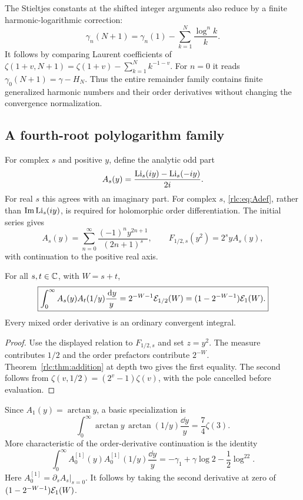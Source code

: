 The Stieltjes constants at the shifted integer arguments also reduce
by a finite harmonic-logarithmic correction:
\begin{equation}\label{rlc:eq:stieltjesshift}
 \gamma_n(N+1)=\gamma_n(1)
           -\sum_{k=1}^N\frac{\log^n k}{k}.
\end{equation}
It follows by comparing Laurent coefficients of
$\zeta(1+v,N+1)=\zeta(1+v)-\sum_{k=1}^N k^{-1-v}$.
For $n=0$ it reads $\gamma_0(N+1)=\gamma-H_N$.
Thus the entire remainder family contains finite generalized harmonic
numbers and their order derivatives without changing the convergence
normalization.

\subsection{A fourth-root polylogarithm family}
For complex $s$ and positive $y$, define the analytic odd part
\begin{equation}\label{rlc:eq:Adef}
 A_s(y)=\frac{\operatorname{Li}_s(iy)-\operatorname{Li}_s(-iy)}{2i}.
\end{equation}
For real $s$ this agrees with an imaginary part. For complex $s$,
\eqref{rlc:eq:Adef}, rather than $\operatorname{Im}\operatorname{Li}_s(iy)$, is required for
holomorphic order differentiation.
The initial series gives
\[
 A_s(y)=\sum_{n=0}^\infty\frac{(-1)^ny^{2n+1}}{(2n+1)^s},\qquad
 F_{1/2,s}(y^2)=2^s y A_s(y),
\]
with continuation to the positive real axis.

\begin{corollary}
\label{rlc:cor:gaussian}
For all $s,t\in\mathbb C$, with $W=s+t$,
\begin{equation}\label{rlc:eq:gaussian}
 \boxed{\displaystyle
 \int_0^\infty A_s(y)A_t(1/y)\frac{\,\mathrm d y}{y}
 =2^{-W-1}\mathcal E_{1/2}(W)
       =(1-2^{-W-1})\mathcal E_1(W).}
\end{equation}
Every mixed order derivative is an ordinary convergent integral.
\end{corollary}
\begin{proof}
Use the displayed relation to $F_{1/2,s}$ and set $z=y^2$.
The measure contributes $1/2$ and the order prefactors contribute
$2^{-W}$. Theorem~\ref{rlc:thm:addition} at depth two gives the first
equality. The second follows from
$\zeta(v,1/2)=(2^v-1)\zeta(v)$, with the pole cancelled before evaluation.
\end{proof}

Since $A_1(y)=\arctan y$, a basic specialization is
\begin{equation}\label{rlc:eq:arctan}
 \int_0^\infty\arctan y\,\arctan(1/y)\frac{\dd y}{y}
     =\frac74\zeta(3).
\end{equation}
More characteristic of the order-derivative continuation is the identity
\begin{equation}\label{rlc:eq:gaussianjets}
 \int_0^\infty A_0^{[1]}(y)A_0^{[1]}(1/y)\frac{\dd y}{y}
 =-\gamma_1+\gamma\log2-\frac12\log^22.
\end{equation}
Here $A_0^{[1]}=\left.\partial_sA_s\right|_{s=0}$.
It follows by taking the second derivative at zero of
$(1-2^{-W-1})\mathcal E_1(W)$.

